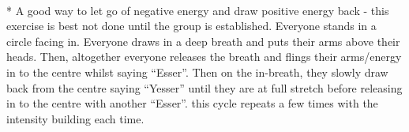 \begin{minipage}{\textwidth}
\\*
A good way to let go of negative energy and draw positive energy back - this exercise is best not done until the group is established. Everyone stands in a circle facing in. Everyone draws in a deep breath and puts their arms above their heads. Then, altogether everyone releases the breath and flings their arms/energy in to the centre whilst saying “Esser”. Then on the in-breath, they slowly draw back from the centre saying “Yesser” until they are at full stretch before releasing in to the centre with another “Esser”.  this cycle repeats a few times with the intensity building each time.
\end{minipage}    \vfill
